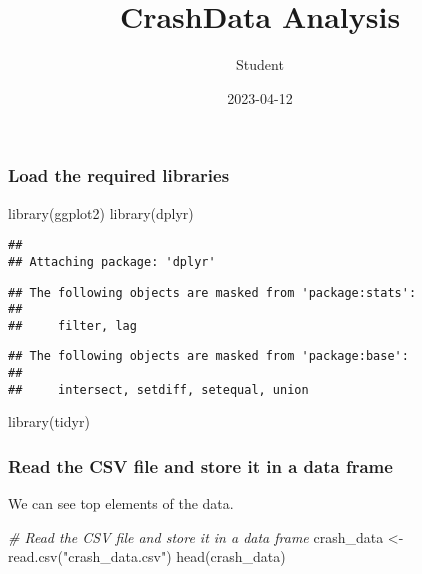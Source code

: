 \documentclass[
]{article}
\title{CrashData Analysis}
\author{Student}
\date{2023-04-12}
\newenvironment{Shaded}{\begin{snugshade}}{\end{snugshade}}
\newcommand{\CommentTok}[1]{\textcolor[rgb]{0.56,0.35,0.01}{\textit{#1}}}
\newcommand{\FunctionTok}[1]{\textcolor[rgb]{0.00,0.00,0.00}{#1}}
\newcommand{\NormalTok}[1]{#1}
\newcommand{\OtherTok}[1]{\textcolor[rgb]{0.56,0.35,0.01}{#1}}
\newcommand{\StringTok}[1]{\textcolor[rgb]{0.31,0.60,0.02}{#1}}
\begin{document}
\maketitle

\hypertarget{load-the-required-libraries}{%
\subsubsection{Load the required
libraries}\label{load-the-required-libraries}}

\begin{Shaded}
\begin{Highlighting}[]
\FunctionTok{library}\NormalTok{(ggplot2)}
\FunctionTok{library}\NormalTok{(dplyr)}
\end{Highlighting}
\end{Shaded}

\begin{verbatim}
## 
## Attaching package: 'dplyr'
\end{verbatim}

\begin{verbatim}
## The following objects are masked from 'package:stats':
## 
##     filter, lag
\end{verbatim}

\begin{verbatim}
## The following objects are masked from 'package:base':
## 
##     intersect, setdiff, setequal, union
\end{verbatim}

\begin{Shaded}
\begin{Highlighting}[]
\FunctionTok{library}\NormalTok{(tidyr)}
\end{Highlighting}
\end{Shaded}

\hypertarget{read-the-csv-file-and-store-it-in-a-data-frame}{%
\subsubsection{Read the CSV file and store it in a data
frame}\label{read-the-csv-file-and-store-it-in-a-data-frame}}

We can see top elements of the data.

\begin{Shaded}
\begin{Highlighting}[]
\CommentTok{\# Read the CSV file and store it in a data frame}
\NormalTok{crash\_data }\OtherTok{\textless{}{-}} \FunctionTok{read.csv}\NormalTok{(}\StringTok{"crash\_data.csv"}\NormalTok{)}
\FunctionTok{head}\NormalTok{(crash\_data)}
\end{Highlighting}
\end{Shaded}
\end{document}

